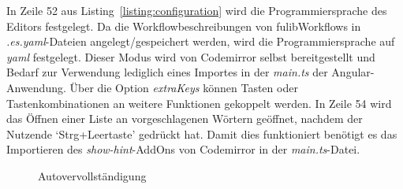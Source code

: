 In Zeile 52 aus Listing~\ref{listing:configuration} wird die Programmiersprache des Editors festgelegt.
Da die Workflowbeschreibungen von fulibWorkflows in \textit{.es.yaml}-Dateien angelegt/gespeichert werden, wird die Programmiersprache auf \textit{yaml} festgelegt.
Dieser Modus wird von Codemirror selbst bereitgestellt und Bedarf zur Verwendung lediglich eines Importes in der \textit{main.ts} der Angular-Anwendung.
Über die Option \textit{extraKeys} können Tasten oder Tastenkombinationen an weitere Funktionen gekoppelt werden.
In Zeile 54 wird das Öffnen einer Liste an vorgeschlagenen Wörtern geöffnet, nachdem der Nutzende `Strg+Leertaste' gedrückt hat.
Damit dies funktioniert benötigt es das Importieren des \textit{show-hint}-AddOns von Codemirror in der \textit{main.ts}-Datei.

\begin{figure}%
    \centering
    \qquad
    \caption{Autovervollständigung}%
    \label{fig:autocompletion}%
\end{figure}

